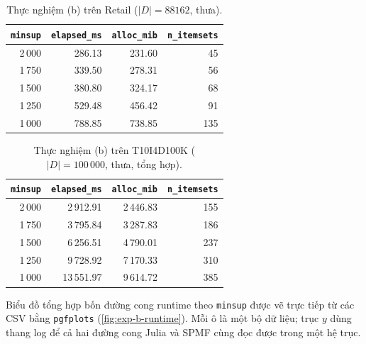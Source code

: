 \begin{table}[htbp]
    \centering
    \caption{Thực nghiệm (b) trên Retail ($|D|=88162$, thưa).}
    \label{tab:exp-b-retail}
    \begin{tabular}{r|r|r|r}
        \hline
        \texttt{minsup} & \texttt{elapsed\_ms} & \texttt{alloc\_mib} & \texttt{n\_itemsets} \\ \hline
        2\,000 & 286.13 & 231.60 & 45 \\
        1\,750 & 339.50 & 278.31 & 56 \\
        1\,500 & 380.80 & 324.17 & 68 \\
        1\,250 & 529.48 & 456.42 & 91 \\
        1\,000 & 788.85 & 738.85 & 135 \\
        \hline
    \end{tabular}
\end{table}

\begin{table}[htbp]
    \centering
    \caption{Thực nghiệm (b) trên T10I4D100K ($|D|=100\,000$, thưa, tổng hợp).}
    \label{tab:exp-b-t10i4d}
    \begin{tabular}{r|r|r|r}
        \hline
        \texttt{minsup} & \texttt{elapsed\_ms} & \texttt{alloc\_mib} & \texttt{n\_itemsets} \\ \hline
        2\,000 & 2\,912.91  & 2\,446.83 & 155 \\
        1\,750 & 3\,795.84  & 3\,287.83 & 186 \\
        1\,500 & 6\,256.51  & 4\,790.01 & 237 \\
        1\,250 & 9\,728.92  & 7\,170.33 & 310 \\
        1\,000 & 13\,551.97 & 9\,614.72 & 385 \\
        \hline
    \end{tabular}
\end{table}

Biểu đồ tổng hợp bốn đường cong runtime theo \texttt{minsup} được vẽ trực tiếp từ các CSV bằng \texttt{pgfplots} (\autoref{fig:exp-b-runtime}). Mỗi ô là một bộ dữ liệu; trục $y$ dùng thang log để cả hai đường cong Julia và SPMF cùng đọc được trong một hệ trục.

